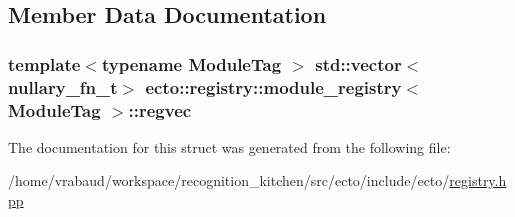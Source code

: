 \subsection{Member Data Documentation}
\hypertarget{structecto_1_1registry_1_1module__registry_a77ae3e886433428c82d5dbb8039d53f6}{
\subsubsection[{regvec}]{\setlength{\rightskip}{0pt plus 5cm}template$<$typename Module\-Tag $>$ std\-::vector$<${\bf nullary\-\_\-fn\-\_\-t}$>$ {\bf ecto\-::registry\-::module\-\_\-registry}$<$ Module\-Tag $>$\-::regvec}}\label{structecto_1_1registry_1_1module__registry_a77ae3e886433428c82d5dbb8039d53f6}


The documentation for this struct was generated from the following file\-:\begin{DoxyCompactItemize}
\item 
/home/vrabaud/workspace/recognition\-\_\-kitchen/src/ecto/include/ecto/\hyperlink{registry_8hpp}{registry.\-hpp}\end{DoxyCompactItemize}

